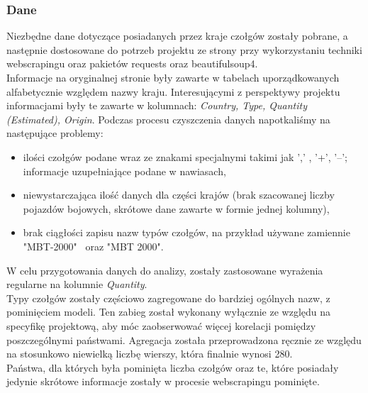 \subsubsection{Dane}
Niezbędne dane dotyczące posiadanych przez kraje czołgów zostały pobrane, a następnie dostosowane do potrzeb projektu ze strony\cite{dcp19} przy wykorzystaniu techniki webscrapingu oraz pakietów requests oraz beautifulsoup4. \\
Informacje na oryginalnej stronie były zawarte w tabelach uporządkowanych alfabetycznie względem nazwy kraju. Interesującymi z perspektywy projektu informacjami były te zawarte w kolumnach: \textit{Country, Type, Quantity (Estimated), Origin}. Podczas procesu czyszczenia danych napotkaliśmy na następujące problemy:
\begin{itemize}
    \item ilości czołgów podane wraz ze znakami specjalnymi takimi jak ',' , '+', '–'; informacje uzupełniające podane w nawiasach,
    \item niewystarczająca ilość danych dla części krajów (brak szacowanej liczby pojazdów bojowych, skrótowe dane zawarte w formie jednej kolumny),
    \item brak ciągłości zapisu nazw typów czołgów, na przykład używane zamiennie "MBT-2000" \ oraz "MBT 2000". \\
\end{itemize}
\indent W celu przygotowania danych do analizy, zostały zastosowane wyrażenia regularne na kolumnie \textit{Quantity}.\\
Typy czołgów zostały częściowo zagregowane do bardziej ogólnych nazw, z pominięciem modeli. Ten zabieg został wykonany wyłącznie ze względu na specyfikę projektową, aby móc zaobserwować więcej korelacji pomiędzy poszczególnymi państwami. Agregacja została przeprowadzona ręcznie ze względu na stosunkowo niewielką liczbę wierszy, która finalnie wynosi 280. \\
Państwa, dla których była pominięta liczba czołgów oraz te, które posiadały jedynie skrótowe informacje zostały w procesie webscrapingu pominięte.\\
